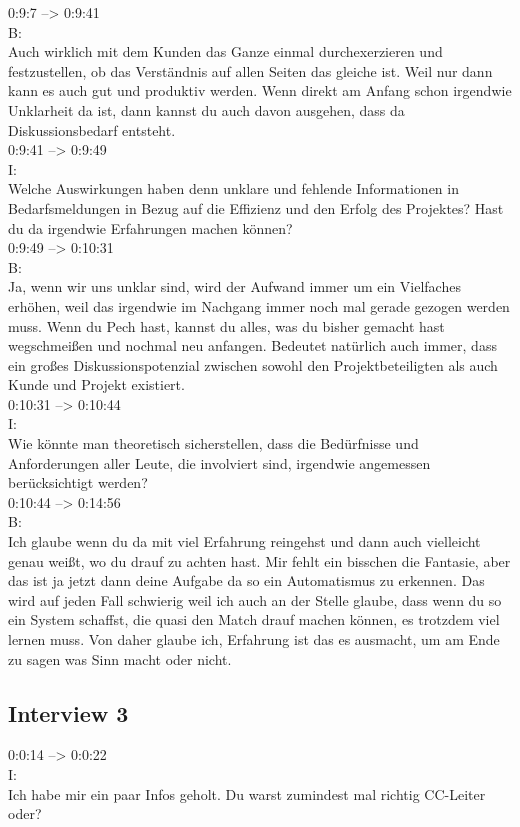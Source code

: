 0:9:7 --> 0:9:41\\
B:\\
Auch wirklich mit dem Kunden das Ganze einmal durchexerzieren und festzustellen, ob das Verständnis auf allen Seiten das gleiche ist. Weil nur dann kann es auch gut und produktiv werden. Wenn direkt am Anfang schon irgendwie Unklarheit da ist, dann kannst du auch davon ausgehen, dass da Diskussionsbedarf entsteht.\\

0:9:41 --> 0:9:49\\
I:\\
Welche Auswirkungen haben denn unklare und fehlende Informationen in Bedarfsmeldungen in Bezug auf die Effizienz und den Erfolg des Projektes? Hast du da irgendwie Erfahrungen machen können?\\

0:9:49 --> 0:10:31\\
B:\\
Ja, wenn wir uns unklar sind, wird der Aufwand immer um ein Vielfaches erhöhen, weil das irgendwie im Nachgang immer noch mal gerade gezogen werden muss. Wenn du Pech hast, kannst du alles, was du bisher gemacht hast wegschmeißen und nochmal neu anfangen. Bedeutet natürlich auch immer, dass ein großes Diskussionspotenzial zwischen sowohl den Projektbeteiligten als auch Kunde und Projekt existiert.\\

0:10:31 --> 0:10:44\\
I:\\
Wie könnte man theoretisch sicherstellen, dass die Bedürfnisse und Anforderungen aller Leute, die involviert sind, irgendwie angemessen berücksichtigt werden?\\

0:10:44 --> 0:14:56\\
B:\\
Ich glaube wenn du da mit viel Erfahrung reingehst und dann auch vielleicht genau weißt, wo du drauf zu achten hast. Mir fehlt ein bisschen die Fantasie, aber das ist ja jetzt dann deine Aufgabe da so ein Automatismus zu erkennen. Das wird auf jeden Fall schwierig weil ich auch an der Stelle glaube, dass wenn du so ein System schaffst, die quasi den Match drauf machen können, es trotzdem viel lernen muss. Von daher glaube ich, Erfahrung ist das es ausmacht, um am Ende zu sagen was Sinn macht oder nicht.\\
\subsection{Interview 3}
\label{interview3}
0:0:14 --> 0:0:22\\
I:\\
Ich habe mir ein paar Infos geholt. Du warst zumindest mal richtig CC-Leiter oder?\\

